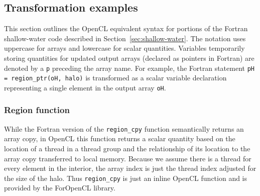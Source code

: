 



\subsection{Transformation examples}

This section outlines the OpenCL equivalent syntax for portions of the Fortran
shallow-water code described in Section~\ref{sec:shallow-water}.  The notation
uses uppercase for arrays and lowercase for scalar quantities.  Variables
temporarily storing quantities for updated output arrays (declared as pointers
in Fortran) are denoted by a {\tt p} preceding the array name.  For example, the
Fortran statement {\tt pH = region\_ptr(oH, halo)} is transformed as a scalar
variable declaration representing a single element in the output array {\tt oH}.

\subsubsection{Region function}

While the Fortran version of the {\tt region\_cpy} function semantically returns
an array copy, in OpenCL this function returns a scalar quantity based on the
location of a thread in a thread group and the relationship of its location to
the array copy transferred to local memory.  Because we assume there is a thread
for every element in the interior, the array index is just the thread index
adjusted for the size of the halo.  Thus {\tt region\_cpy} is just an inline
OpenCL function and is provided by the ForOpenCL library.

